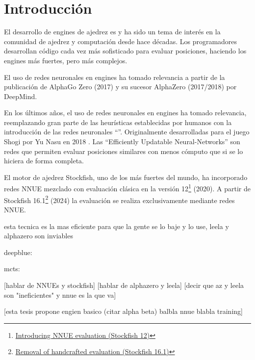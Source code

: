 \section*{Introducción}

El desarrollo de engines de ajedrez es y ha sido un tema de interés en la comunidad de ajedrez y computación desde hace décadas. Los programadores desarrollan código cada vez más sofisticado para evaluar posiciones, haciendo los engines más fuertes, pero más complejos.

El uso de redes neuronales en engines ha tomado relevancia a partir de la publicación de AlphaGo Zero \cite{alphagozero:2017} (2017) y su sucesor AlphaZero \cite{alphazero:2017,alphazero:2018} (2017/2018) por DeepMind.






En los últimos años, el uso de redes neuronales en engines ha tomado relevancia, reemplazando gran parte de las heurísticas establecidas por humanos con la introducción de las redes neuronales ``''. Originalmente desarrolladas para el juego Shogi por Yu Nasu en 2018 \cite{nnue:2018}. Las ``Efficiently Updatable Neural-Networks'' son redes que permiten evaluar posiciones similares con menos cómputo que si se lo hiciera de forma completa.

El motor de ajedrez Stockfish, uno de los más fuertes del mundo, ha incorporado redes NNUE mezclado con evaluación clásica en la versión 12\footnote[1]{\href{https://stockfishchess.org/blog/2020/introducing-nnue-evaluation/}{Introducing NNUE evaluation (Stockfish 12)}} (2020). A partir de Stockfish 16.1\footnote[2]{\href{https://stockfishchess.org/blog/2024/stockfish-16-1/}{Removal of handcrafted evaluation (Stockfish 16.1)}} (2024) la evaluación se realiza exclusivamente mediante redes NNUE.


esta tecnica es la mas eficiente para que la gente se lo baje y lo use, leela y alphazero son inviables

deepblue: \cite{deepblue:2002}

mcts: \cite{mcts-survey:2012}

[hablar de NNUEs y stockfish]
[hablar de alphazero y leela]
[decir que az y leela son "ineficientes" y nnue es la que va]

[esta tesis propone engien basico (citar alpha beta) balbla nnue blabla training]

